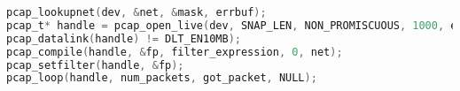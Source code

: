 \begin{lstlisting}[frame= single, language=C, caption=Pcap functions called to start getting the packets on the network (Error handling omitted).]
pcap_lookupnet(dev, &net, &mask, errbuf);
pcap_t* handle = pcap_open_live(dev, SNAP_LEN, NON_PROMISCUOUS, 1000, errbuf);
pcap_datalink(handle) != DLT_EN10MB);
pcap_compile(handle, &fp, filter_expression, 0, net);
pcap_setfilter(handle, &fp);
pcap_loop(handle, num_packets, got_packet, NULL);
\end{lstlisting}











